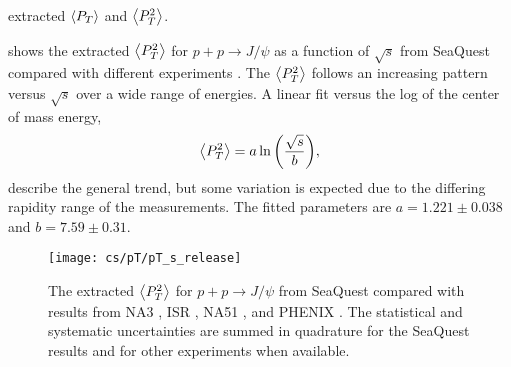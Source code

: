 \documentclass[../main.tex]{subfiles}
\begin{document}
\begin{table}[h!]
	\centering
	\caption{extracted $\expval{P_T}$ and $\expval{P^2_T}$.}
	\label{tab:kaplan_result}
	
\end{table}

 shows the extracted $\expval{P_T^2}$ for $p+p\to J/\psi$ as a function
of $\sqrt{s}$ from SeaQuest compared with different experiments
\cite{badier1983,clark1978,drapier1998,acharya2020}. The $\expval{P_T^2}$ follows an
increasing pattern versus $\sqrt{s}$ over a wide range of energies.
A linear fit versus the log of the center of mass energy\cite{acharya2020},
\begin{equation}
	\expval{P_T^2}=a\ln{\left( \frac{\sqrt{s}}{b} \right)},
\end{equation}
describe the general trend, but some variation is expected due to the differing
rapidity range of the measurements.
The fitted parameters are $a=1.221\pm0.038$ and $b=7.59\pm0.31$.
\begin{figure}
	\centering
	\texttt{[image: cs/pT/pT\_s\_release]}
	\caption{The extracted $\expval{P_T^2}$ for $p+p\rightarrow J/\psi$ from SeaQuest compared
		with results from NA3 \cite{badier1983}, ISR \cite{clark1978}, NA51 \cite{drapier1998},
		and PHENIX \cite{acharya2020}. The statistical and systematic uncertainties are summed in quadrature for
		the SeaQuest results and for other experiments when available.   }
	\label{fig:pT_s}
\end{figure}

\FloatBarrier

\ifSubfilesClassLoaded{ \printbibliography[heading=bibintoc,title={References}]}{}
\end{document}
